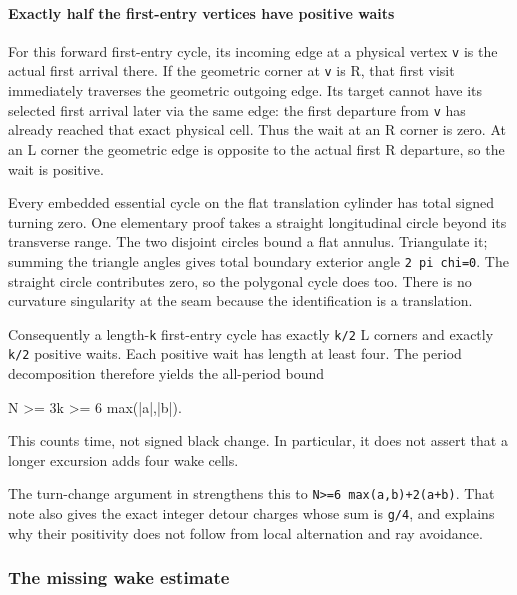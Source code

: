 \documentclass[11pt,letterpaper]{article}
\theoremstyle{plain}
\theoremstyle{definition}
\begin{document}
\begin{NoHyper}
\paragraph{Exactly half the first-entry vertices have positive waits}

For this forward first-entry cycle, its incoming edge at a physical vertex \texttt{v} is the actual first arrival there. If the geometric corner at \texttt{v} is R, that first visit immediately traverses the geometric outgoing edge. Its target cannot have its selected first arrival later via the same edge: the first departure from \texttt{v} has already reached that exact physical cell. Thus the wait at an R corner is zero. At an L corner the geometric edge is opposite to the actual first R departure, so the wait is positive.

Every embedded essential cycle on the flat translation cylinder has total signed turning zero. One elementary proof takes a straight longitudinal circle beyond its transverse range. The two disjoint circles bound a flat annulus. Triangulate it; summing the triangle angles gives total boundary exterior angle \texttt{2\ pi\ chi=0}. The straight circle contributes zero, so the polygonal cycle does too. There is no curvature singularity at the seam because the identification is a translation.

Consequently a length-\texttt{k} first-entry cycle has exactly \texttt{k/2} L corners and exactly \texttt{k/2} positive waits. Each positive wait has length at least four. The period decomposition therefore yields the all-period bound

\begin{codeblock}
N >= 3k >= 6 max(|a|,|b|).
\end{codeblock}

This counts time, not signed black change. In particular, it does not assert that a longer excursion adds four wake cells.

The turn-change argument in  strengthens this to \texttt{N\textgreater{}=6\ max(\textbar{}a\textbar{},\textbar{}b\textbar{})+2(\textbar{}a\textbar{}+\textbar{}b\textbar{})}. That note also gives the exact integer detour charges whose sum is \texttt{g/4}, and explains why their positivity does not follow from local alternation and ray avoidance.

\subsubsection{The missing wake estimate}


\end{NoHyper}
\end{document}
